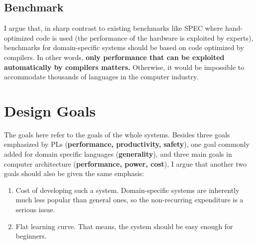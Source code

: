 \documentclass[11pt]{article}
\begin{document}

\subsection{Benchmark}
I argue that, in sharp contrast to existing benchmarks like SPEC where hand-optimized code is used (the performance of the hardware is exploited by experts), benchmarks for domain-specific systems should be based on code optimized by compilers.
In other words, \textbf{only performance that can be exploited automatically by compilers matters.}
Otherwise, it would be impossible to accommodate thousands of languages in the computer industry.


\section{Design Goals}
The goals here refer to the goals of the whole systems. Besides three goals emphasized by PLs (\textbf{performance, productivity, safety}), one goal commonly added for domain specific languages (\textbf{generality}), and three main goals in computer architecture (\textbf{performance, power, cost}), I argue that another two goals should also be given the same emphasis:
\begin{enumerate}
    \item Cost of developing such a system.
    Domain-specific systems are inherently much less popular than general ones, so the non-recurring expenditure is a serious issue.
    \item Flat learning curve.
    That means, the system should be easy enough for beginners.
\end{enumerate}
\end{document}
